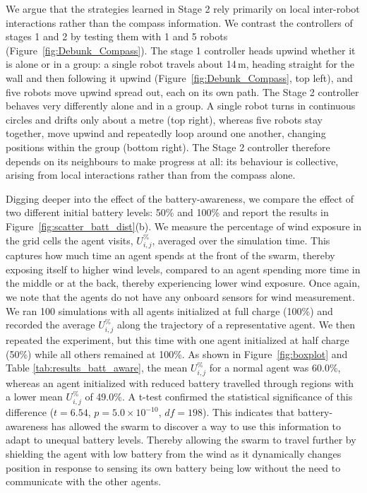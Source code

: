 \documentclass[runningheads]{llncs}
\begin{document}
We argue that the strategies learned in Stage 2 rely primarily on local inter-robot interactions rather than the compass information. We contrast the controllers of stages 1 and 2 by testing them with 1 and 5 robots (Figure~\ref{fig:Debunk_Compass}). The stage 1 controller heads upwind whether it is alone or in a group: a single robot travels about 14\,m, heading straight for the wall and then following it upwind (Figure~\ref{fig:Debunk_Compass}, top left), and five robots move upwind spread out, each on its own path. The Stage 2 controller behaves very differently alone and in a group. A single robot turns in continuous circles and drifts only about a metre (top right), whereas five robots stay together, move upwind and repeatedly loop around one another, changing positions within the group (bottom right). The Stage 2 controller therefore depends on its neighbours to make progress at all: its behaviour is collective, arising from local interactions rather than from the compass alone.

Digging deeper into the effect of the battery-awareness, we compare the effect of two different initial battery levels: 50\% and 100\% and report the results in Figure~\ref{fig:scatter_batt_dist}(b). We measure the percentage of wind exposure in the grid cells the agent visits, $U_{i,j}^\%$, averaged over the simulation time. This captures how much time an agent spends at the front of the swarm, thereby exposing itself to higher wind levels, compared to an agent spending more time in the middle or at the back, thereby experiencing lower wind exposure. Once again, we note that the agents do not have any onboard sensors for wind measurement. We ran 100 simulations with all agents initialized at full charge (100\%) and recorded the average $U_{i,j}^\%$ along the trajectory of a representative agent. We then repeated the experiment, but this time with one agent initialized at half charge (50\%) while all others remained at 100\%. As shown in Figure~\ref{fig:boxplot} and Table \ref{tab:results_batt_aware}, the mean $U_{i,j}^\%$ for a normal agent was 60.0\%, whereas an agent initialized with reduced battery travelled through regions with a lower mean $U_{i,j}^\%$ of 49.0\%. A t-test confirmed the statistical significance of this difference ($t = 6.54$, $p=5.0\times10^{-10}$, $df=198$). This indicates that battery-awareness has allowed the swarm to discover a way to use this information to adapt to unequal battery levels. Thereby allowing the swarm to travel further by shielding the agent with low battery from the wind as it dynamically changes position in response to sensing its own battery being low without the need to communicate with the other agents.
\end{document}
